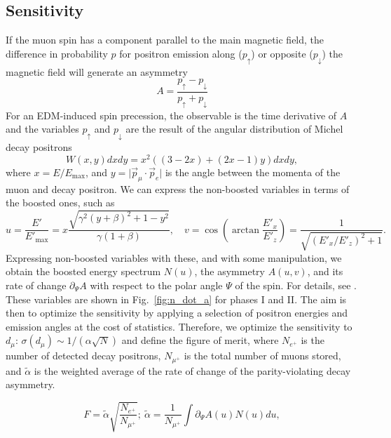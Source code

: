 \begin{refsection}
\section{Sensitivity}
\label{sec:muEDM:sensitivity}
    If the muon spin has a component parallel to the main magnetic field, the difference in probability $p$ for positron emission along ($p_\uparrow$) or opposite ($p_\downarrow$) the magnetic field will generate an asymmetry
    \begin{equation}
        A = \frac{p_\uparrow - p_\downarrow}{p_\uparrow + p_\downarrow}
    \label{eq:asym_theory}
    \end{equation}        
    For an EDM-induced spin precession, the observable is the time derivative of $A$ and the variables $p_\uparrow$ and $p_\downarrow$ are the result of the angular distribution of Michel decay positrons
    \begin{equation}
        W(x, y)dxdy = x^2 \left((3-2x) + (2x - 1)y\right)dxdy,
    \end{equation}
    where $x = E/E_\mathrm{max}$, and $y = \lvert \vec p_\mu \cdot \vec p_e \rvert$ is the angle between the momenta of the muon and decay positron. 
    We can express the non-boosted variables in terms of the boosted ones, such as
    \begin{equation}
	u = \frac{E'}{E'_\mathrm{max}} = x\frac{\sqrt{\gamma^2 (y+\beta)^2 + 1 - y^2}}{\gamma(1+\beta)},\quad
	v = \cos\left(\arctan\frac{E'_x}{E'_z}\right) = \frac{1}{\sqrt{(E'_x/E'_z)^2 + 1}}.
    \end{equation}
    Expressing non-boosted variables with these, and with some manipulation, we obtain the boosted energy spectrum $N(u)$, the asymmetry $A(u, v)$, and its rate of change $\partial_\Psi A$ with respect to the polar angle $\Psi$ of the spin.
    For details, see \cite{chavdar:2023}.
    These variables are shown in Fig.~\ref{fig:n_dot_a} for phases I and II.
    \noindent
    The aim is then to optimize the sensitivity by applying a selection of positron energies and emission angles at the cost of statistics. Therefore, we optimize the sensitivity to $d_\mu$: $\sigma(d_\mu) \sim 1/(\alpha\sqrt{N})$ and define the figure of merit, where $N_{e^+}$ is the number of detected decay positrons, $N_{\mu^+}$ is the total number of muons stored, and $\tilde\alpha$ is the weighted average of the rate of change of the parity-violating decay asymmetry. 

    \begin{equation}
	F = \tilde\alpha \sqrt{\frac{N_{e^+}}{N_{\mu^+}}}; \ 
    \tilde\alpha = \frac{1}{N_{\mu^+}} \int \partial_\Psi A(u) N(u)
	du,
	\label{eq:figure_of_merit}
    \end{equation}


\end{refsection}
